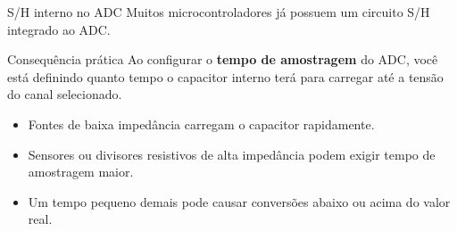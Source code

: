 \begin{frame}{S/H interno no ADC}
  Muitos microcontroladores já possuem um circuito S/H integrado ao ADC.

  \begin{block}{Consequência prática}
    Ao configurar o \textbf{tempo de amostragem} do ADC, você está definindo quanto tempo o capacitor interno terá para carregar até a tensão do canal selecionado.
  \end{block}

  \begin{itemize}
    \item Fontes de baixa impedância carregam o capacitor rapidamente.
    \item Sensores ou divisores resistivos de alta impedância podem exigir tempo de amostragem maior.
    \item Um tempo pequeno demais pode causar conversões abaixo ou acima do valor real.
  \end{itemize}
\end{frame}